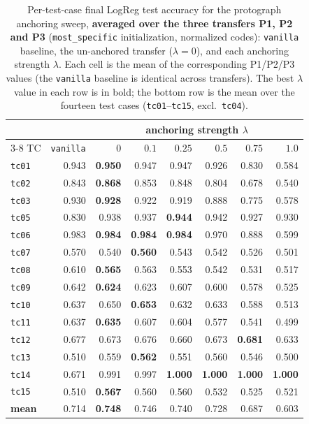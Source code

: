 \begin{table}[p]
\centering
\small
\caption{Per-test-case final LogReg test accuracy for the protograph anchoring sweep, \textbf{averaged over the three transfers P1, P2 and P3} (\texttt{most\_specific} initialization, normalized codes): \texttt{vanilla} baseline, the un-anchored transfer ($\lambda=0$), and each anchoring strength $\lambda$. Each cell is the mean of the corresponding P1/P2/P3 values (the \texttt{vanilla} baseline is identical across transfers). The best $\lambda$ value in each row is in bold; the bottom row is the mean over the fourteen test cases (\texttt{tc01}--\texttt{tc15}, excl.\ \texttt{tc04}).}
\label{tab:anchoring_pertc_avg}
\begin{tabular}{l r rrrrrr}
\toprule
 & & \multicolumn{6}{c}{anchoring strength $\lambda$} \\
\cmidrule(lr){3-8}
TC & \texttt{vanilla} & $0$ & $0.1$ & $0.25$ & $0.5$ & $0.75$ & $1.0$ \\
\midrule
\texttt{tc01} & 0.943 & \textbf{0.950} & 0.947 & 0.947 & 0.926 & 0.830 & 0.584 \\
\texttt{tc02} & 0.843 & \textbf{0.868} & 0.853 & 0.848 & 0.804 & 0.678 & 0.540 \\
\texttt{tc03} & 0.930 & \textbf{0.928} & 0.922 & 0.919 & 0.888 & 0.775 & 0.578 \\
\texttt{tc05} & 0.830 & 0.938 & 0.937 & \textbf{0.944} & 0.942 & 0.927 & 0.930 \\
\texttt{tc06} & 0.983 & \textbf{0.984} & \textbf{0.984} & \textbf{0.984} & 0.970 & 0.888 & 0.599 \\
\texttt{tc07} & 0.570 & 0.540 & \textbf{0.560} & 0.543 & 0.542 & 0.526 & 0.501 \\
\texttt{tc08} & 0.610 & \textbf{0.565} & 0.563 & 0.553 & 0.542 & 0.531 & 0.517 \\
\texttt{tc09} & 0.642 & \textbf{0.624} & 0.623 & 0.607 & 0.600 & 0.578 & 0.525 \\
\texttt{tc10} & 0.637 & 0.650 & \textbf{0.653} & 0.632 & 0.633 & 0.588 & 0.513 \\
\texttt{tc11} & 0.637 & \textbf{0.635} & 0.607 & 0.604 & 0.577 & 0.541 & 0.499 \\
\texttt{tc12} & 0.677 & 0.673 & 0.676 & 0.660 & 0.673 & \textbf{0.681} & 0.633 \\
\texttt{tc13} & 0.510 & 0.559 & \textbf{0.562} & 0.551 & 0.560 & 0.546 & 0.500 \\
\texttt{tc14} & 0.671 & 0.991 & 0.997 & \textbf{1.000} & \textbf{1.000} & \textbf{1.000} & \textbf{1.000} \\
\texttt{tc15} & 0.510 & \textbf{0.567} & 0.560 & 0.560 & 0.532 & 0.525 & 0.521 \\
\midrule
\textbf{mean} & 0.714 & \textbf{0.748} & 0.746 & 0.740 & 0.728 & 0.687 & 0.603 \\
\bottomrule
\end{tabular}
\end{table}
